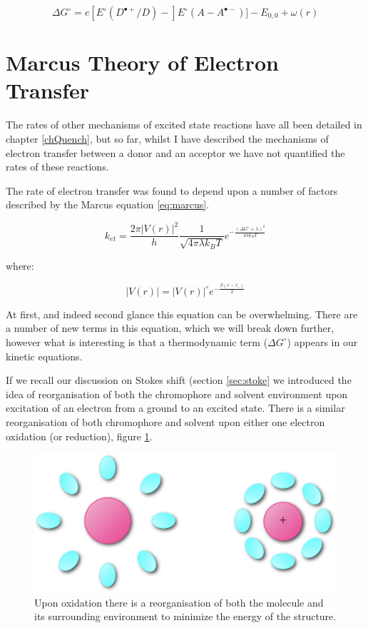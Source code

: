 \documentclass[
]{book}
\begin{document}
\begin{equation}
\Delta G ^\circ = e[E^\circ(D^{\bullet +}/D)-]E^\circ(A-A^{\bullet -})]-E_{0,0} + \omega (r)
\label{eq:rehmweller}
\end{equation}

\hypertarget{sec:marcus}{%
\section{Marcus Theory of Electron Transfer}\label{sec:marcus}}

The rates of other mechanisms of excited state reactions have all been detailed in chapter \ref{chQuench}, but so far, whilst I have described the mechanisms of electron transfer between a donor and an acceptor we have not quantified the rates of these reactions.

The rate of electron transfer was found to depend upon a number of factors described by the Marcus equation \eqref{eq:marcus}.

\begin{equation}
k_{et}=\frac{2 \pi |V(r)|^2}{h}\frac{1}{\sqrt{4 \pi \lambda k_B T}}e^{-\frac{(\Delta G^\circ+ \lambda)^2}{4 \lambda k_B T}}
\label{eq:marcus}
\end{equation}

where:

\begin{equation}
|V(r)|=|V(r)|^\circ e^{-\frac{\beta(r-r_\circ)}{2}}
\label{eq:coupel}
\end{equation}

At first, and indeed second glance this equation can be overwhelming. There are a number of new terms in this equation, which we will break down further, however what is interesting is that a thermodynamic term (\(\Delta G^\circ\)) appears in our kinetic equations.

If we recall our discussion on Stokes shift (section \ref{sec:stoke} we introduced the idea of reorganisation of both the chromophore and solvent environment upon excitation of an electron from a ground to an excited state. There is a similar reorganisation of both chromophore and solvent upon either one electron oxidation (or reduction), figure \ref{fig:elecreorg}.

\begin{figure}

{\centering \includegraphics[width=0.5\linewidth]{images/elecreorg} 

}

\caption{Upon oxidation there is a reorganisation of both the molecule and its surrounding environment to minimize the energy of the structure.}\label{fig:elecreorg}
\end{figure}
\end{document}
